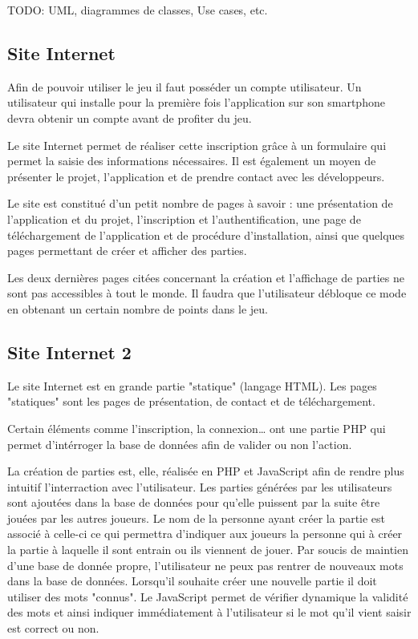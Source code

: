 \documentclass[a4paper,11pt,french]{article}
\begin{document}

TODO: UML, diagrammes de classes, Use cases, etc.

\subsection{Site Internet}
Afin de pouvoir utiliser le jeu il faut posséder un compte utilisateur. Un utilisateur qui installe pour la première fois l'application sur son smartphone devra obtenir un compte avant de profiter du jeu.

Le site Internet permet de réaliser cette inscription grâce à un formulaire qui permet la saisie des informations nécessaires. Il est également un moyen de présenter le projet, l'application et de prendre contact avec les développeurs.

Le site est constitué d'un petit nombre de pages à savoir : une présentation de l'application et du projet, l'inscription et l'authentification, une page de téléchargement de l'application et de procédure d'installation, ainsi que quelques pages permettant de créer et afficher des parties.

Les deux dernières pages citées concernant la création et l'affichage de parties ne sont pas accessibles à tout le monde. Il faudra que l'utilisateur débloque ce mode en obtenant un certain nombre de points dans le jeu.

\subsection{Site Internet 2}
Le site Internet est en grande partie "statique" (langage HTML). Les pages "statiques" sont les pages de présentation, de contact et de téléchargement.

Certain éléments comme l'inscription, la connexion\dots{} ont une partie PHP qui permet d'intérroger la base de données afin de valider ou non l'action.

La création de parties est, elle, réalisée en PHP et JavaScript afin de rendre plus intuitif l'interraction avec l'utilisateur. Les parties générées par les utilisateurs sont ajoutées dans la base de données pour qu'elle puissent par la suite être jouées par les autres joueurs. Le nom de la personne ayant créer la partie est associé à celle-ci ce qui permettra d'indiquer aux joueurs la personne qui à créer la partie à laquelle il sont entrain ou ils viennent de jouer. Par soucis de maintien d'une base de donnée propre, l'utilisateur ne peux pas rentrer de nouveaux mots dans la base de données. Lorsqu'il souhaite créer une nouvelle partie il doit utiliser des mots "connus". Le JavaScript permet de vérifier dynamique la validité des mots et ainsi indiquer immédiatement à l'utilisateur si le mot qu'il vient saisir est correct ou non.
\end{document}
